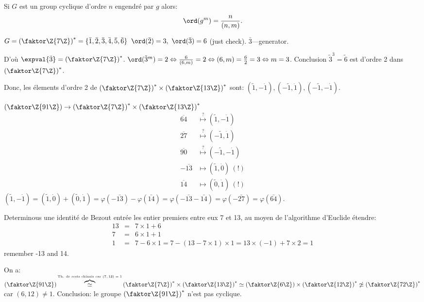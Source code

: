 \begin{rappel}
	Si $G$ est un group cyclique d'ordre $n$ engendré par $g$ alors:
	$$\ord(g^m)=\frac n{(n,m)}.$$
	\begin{remark}
		$G=\left(\faktor\Z{7\Z}\right)^\ast=\{\bar 1, \bar 2, \bar 3,\bar 4,\bar 5,\bar 6\}$
		$\ord(\bar 2)=3,\ \ord(\bar 3)=6$ (just check). $\bar 3$---generator.
	\end{remark}
	D'où $\expval{\tilde 3}=\left(\faktor\Z{7\Z}\right)^\ast$.
	$\ord(\tilde 3^m)=2\Leftrightarrow \frac 6{(6,m)}=2\Leftrightarrow (6,m)=\frac 62 = 3 \Leftrightarrow m=3$. Conclusion $\tilde 3^3=\tilde 6$ est d'ordre 2 dans $\left(\faktor\Z{7\Z}\right)^\ast$.
	
	Donc, les élements d'ordre 2 de $\left(\faktor\Z{7\Z}\right)^\ast\times\left(\faktor\Z{13\Z}\right)^\ast$ sont: $(\tilde 1, -\dot 1),(-\tilde 1, \dot 1),(-\tilde 1, -\dot 1)$. 
	
	$\left(\faktor\Z{91\Z}\right)\rightarrow\left(\faktor\Z{7\Z}\right)^\ast\times\left(\faktor\Z{13\Z}\right)^\ast$
	\begin{align*}
		\overline{64}  &\overset{?}{\mapsto} (\tilde 1, -\dot 1)\\
		\overline{27}  &\overset{?}{\mapsto} (-\tilde 1, \dot 1)\\
		\overline{90}  &\overset{?}{\mapsto} (-\tilde 1, -\dot 1)\\
		-\overline{13}  &\mapsto (\tilde 1, \dot 0)\ (!)\\
		\overline{14}  &\mapsto (\tilde 0, \dot 1)\ (!)
	\end{align*}
	$(\tilde 1, -\dot 1)=(\tilde 1, \dot 0)+(\tilde 0, \dot 1)=\varphi (-\bar{13})-\varphi (\bar{14})=\varphi (-\bar{13}-\bar{14})=\varphi (-\bar{27})=\varphi (\bar{64})$.
	
	Determinous une identité de Bezout entrée les entier premiers entre eux 7 et 13, au moyen de l'algorithme d'Euclide étendre:
	\begin{align*}
		13 &=& 7\times 1+ 6\\
		7 &=& 6\times 1+1\\
		1 &=& 7-6\times 1=7-(13-7\times 1)\times 1=13\times (-1)+7\times 2=1
	\end{align*}
	remember -13 and 14.
\end{rappel}

\begin{remark}
	On a: $\left(\faktor\Z{91\Z}\right)\overbrace{\simeq}^{\mbox{\tiny Th. de rests chinois car $(7,13)=1$}} \left(\faktor\Z{7\Z}\right)^\ast\times \left(\faktor\Z{13\Z}\right)^\ast\simeq \left(\faktor\Z{6\Z}\right)\times \left(\faktor\Z{12\Z}\right)^\ast\not\simeq \left(\faktor\Z{72\Z}\right)^\ast$ car $(6,12)\neq 1$. Conclusion: le groupe $\left(\faktor\Z{91\Z}\right)^\ast$ n'est pas cyclique.
\end{remark}

